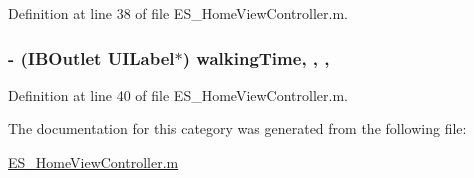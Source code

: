Definition at line 38 of file E\+S\+\_\+\+Home\+View\+Controller.\+m.

\hypertarget{category_e_s___home_view_controller_07_08_ad902a079ef4cad508e5f2fbed07de64e}{
\subsubsection[{walking\+Time}]{\setlength{\rightskip}{0pt plus 5cm}-\/ (I\+B\+Outlet U\+I\+Label$\ast$) walking\+Time\hspace{0.3cm}{\ttfamily [read]}, {\ttfamily [write]}, {\ttfamily [nonatomic]}, {\ttfamily [weak]}}}\label{category_e_s___home_view_controller_07_08_ad902a079ef4cad508e5f2fbed07de64e}


Definition at line 40 of file E\+S\+\_\+\+Home\+View\+Controller.\+m.



The documentation for this category was generated from the following file\+:\begin{DoxyCompactItemize}
\item 
\hyperlink{_e_s___home_view_controller_8m}{E\+S\+\_\+\+Home\+View\+Controller.\+m}\end{DoxyCompactItemize}
